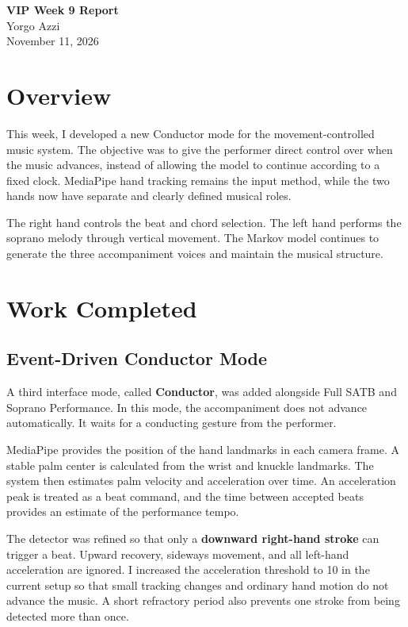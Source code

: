 \documentclass[11pt,a4paper]{article}
\begin{document}
\begin{center}
    {\Large\bfseries VIP Week 9 Report}\\[0.5em]
    {\large Yorgo Azzi}\\[0.25em]
    November 11, 2026
\end{center}

\section{Overview}

This week, I developed a new Conductor mode for the movement-controlled music
system. The objective was to give the performer direct control over when the
music advances, instead of allowing the model to continue according to a fixed
clock. MediaPipe hand tracking remains the input method, while the two hands
now have separate and clearly defined musical roles.

The right hand controls the beat and chord selection. The left hand performs
the soprano melody through vertical movement. The Markov model continues to
generate the three accompaniment voices and maintain the musical structure.

\section{Work Completed}

\subsection{Event-Driven Conductor Mode}

A third interface mode, called \textbf{Conductor}, was added alongside Full
SATB and Soprano Performance. In this mode, the accompaniment does not advance
automatically. It waits for a conducting gesture from the performer.

MediaPipe provides the position of the hand landmarks in each camera frame. A
stable palm center is calculated from the wrist and knuckle landmarks. The
system then estimates palm velocity and acceleration over time. An acceleration
peak is treated as a beat command, and the time between accepted beats provides
an estimate of the performance tempo.

The detector was refined so that only a \textbf{downward right-hand stroke}
can trigger a beat. Upward recovery, sideways movement, and all left-hand
acceleration are ignored. I increased the acceleration threshold to 10 in the
current setup so that small tracking changes and ordinary hand motion do not
advance the music. A short refractory period also prevents one stroke from
being detected more than once.
\end{document}
